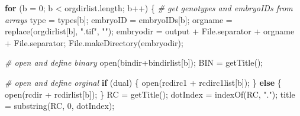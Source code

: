 \documentclass[10pt, b5paper, singlespacinge, twoside]{reedthesis} %
\newenvironment{Shaded}{}{}
\newcommand{\AttributeTok}[1]{#1}
\newcommand{\CommentTok}[1]{\textit{#1}}
\newcommand{\ControlFlowTok}[1]{\textbf{#1}}
\newcommand{\DecValTok}[1]{#1}
\newcommand{\FunctionTok}[1]{#1}
\newcommand{\NormalTok}[1]{#1}
\newcommand{\OtherTok}[1]{#1}
\newcommand{\SpecialCharTok}[1]{#1}
\newcommand{\StringTok}[1]{#1}
\theoremstyle{definition}
\theoremstyle{definition}
\theoremstyle{definition}
\theoremstyle{remark}
\begin{document}
\scriptsize
\begin{Shaded}
\begin{Highlighting}[numbers=left,,]
\ControlFlowTok{for}\NormalTok{ (}\AttributeTok{b =} \DecValTok{0}\NormalTok{; b }\SpecialCharTok{\textless{}}\NormalTok{ orgdirlist.length; b}\SpecialCharTok{++}\NormalTok{) \{}
\CommentTok{\# get genotypes and embryoIDs from arrays}
\NormalTok{    type }\OtherTok{=}\NormalTok{ types[b];}
\NormalTok{    embryoID }\OtherTok{=}\NormalTok{ embryoIDs[b];}
\NormalTok{    orgname }\OtherTok{=} \FunctionTok{replace}\NormalTok{(orgdirlist[b], }\StringTok{".tif"}\NormalTok{, }\StringTok{""}\NormalTok{);}
\NormalTok{    embryodir }\OtherTok{=}\NormalTok{ output }\SpecialCharTok{+}\NormalTok{ File.separator }\SpecialCharTok{+}\NormalTok{ orgname }\SpecialCharTok{+}\NormalTok{ File.separator;}
    \FunctionTok{File.makeDirectory}\NormalTok{(embryodir);}
    
\CommentTok{\# open and define binary}
    \FunctionTok{open}\NormalTok{(bindir}\SpecialCharTok{+}\NormalTok{bindirlist[b]);}
\NormalTok{    BIN }\OtherTok{=} \FunctionTok{getTitle}\NormalTok{();}
          
\CommentTok{\# open and define orginal }
    \ControlFlowTok{if}\NormalTok{ (dual) \{}
        \FunctionTok{open}\NormalTok{(rcdirc1 }\SpecialCharTok{+}\NormalTok{ rcdirc1list[b]);}
\NormalTok{    \} }\ControlFlowTok{else}\NormalTok{ \{}
        \FunctionTok{open}\NormalTok{(rcdir }\SpecialCharTok{+}\NormalTok{ rcdirlist[b]);}
\NormalTok{    \}}
\NormalTok{    RC }\OtherTok{=} \FunctionTok{getTitle}\NormalTok{();}
\NormalTok{    dotIndex }\OtherTok{=} \FunctionTok{indexOf}\NormalTok{(RC, }\StringTok{"."}\NormalTok{);}
\NormalTok{    title }\OtherTok{=} \FunctionTok{substring}\NormalTok{(RC, }\DecValTok{0}\NormalTok{, dotIndex);}
    

\end{Highlighting}
\end{Shaded}
\end{document}
